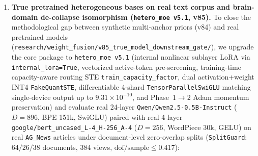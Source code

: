 \documentclass[10pt]{article}
\theoremstyle{definition}
\theoremstyle{plain}
\theoremstyle{remark}
\begin{document}
\begin{enumerate}[leftmargin=1.6em, itemsep=1pt, parsep=0pt]
    \begin{itemize}[leftmargin=1.4em, itemsep=0.5pt, parsep=0pt]
        \item \emph{Classification ($N{=}900$, 64 pretrained domain anchors):} \texttt{v5} reaches held-out test accuracy $\mathbf{0.9111}$, outperforming frozen 2-expert \texttt{v4} ($0.5889$, $+32.22\,\text{pp}$, $p{=}0.0$) and every single-expert no-fusion arm: \texttt{single\_trainable\_fullinput\_nofusion} ($0.4778$, $+43.33\,\text{pp}$), \texttt{frozen\_silu} ($0.4056$), \texttt{frozen\_gelu} ($0.3000$), \texttt{single\_frozen\_fullinput\_lora6} ($0.2722$), and \texttt{single\_frozen\_fullinput\_headonly} ($0.2611$).
        \item \emph{Sequence language modeling ($480 \times 16$ tokens, 8 pretrained morphological variants):} \texttt{v5} achieves held-out test perplexity $\mathbf{4.259}$, a $\mathbf{47.1\%}$ reduction over the best single expert ($8.054$), while single-expert no-fusion baselines without pretrained specialist priors remain at $\mathrm{PPL}=15.300$ (\texttt{single\_lora4}) and $15.347$ (\texttt{single\_trainable}).
    \end{itemize}
    \item \textbf{True pretrained heterogeneous bases on real text corpus and brain-domain de-collapse isomorphism (\texttt{hetero\_moe v5.1}, v85).} To close the methodological gap between synthetic multi-anchor priors (v84) and real pretrained models (\texttt{research/weight\_fusion/v85\_true\_model\_downstream\_gate/}), we upgrade the core package to \texttt{hetero\_moe v5.1} (internal nonlinear sublayer LoRA via \texttt{internal\_lora=True}, vectorized active-token pre-screening, training-time capacity-aware routing STE \texttt{train\_capacity\_factor}, dual activation+weight INT4 \texttt{FakeQuantSTE}, differentiable 4-shard \texttt{TensorParallelSwiGLU} matching single-device output up to $9.31\times 10^{-10}$, and Phase~1$\to$2 Adam momentum preservation) and evaluate real 24-layer \texttt{Qwen/Qwen2.5-0.5B-Instruct} ($D{=}896$, BPE 151k, SwiGLU) paired with real 4-layer \texttt{google/bert\_uncased\_L-4\_H-256\_A-4} ($D{=}256$, WordPiece 30k, GELU) on real \texttt{AG\_News} articles under document-level zero-overlap splits (\texttt{SplitGuard}: $64/26/38$ documents, $384$ views, $\text{dof/sample}\le 0.417$):
    \begin{itemize}[leftmargin=1.4em, itemsep=0.5pt, parsep=0pt]

\end{itemize}
\end{enumerate}
\end{document}
